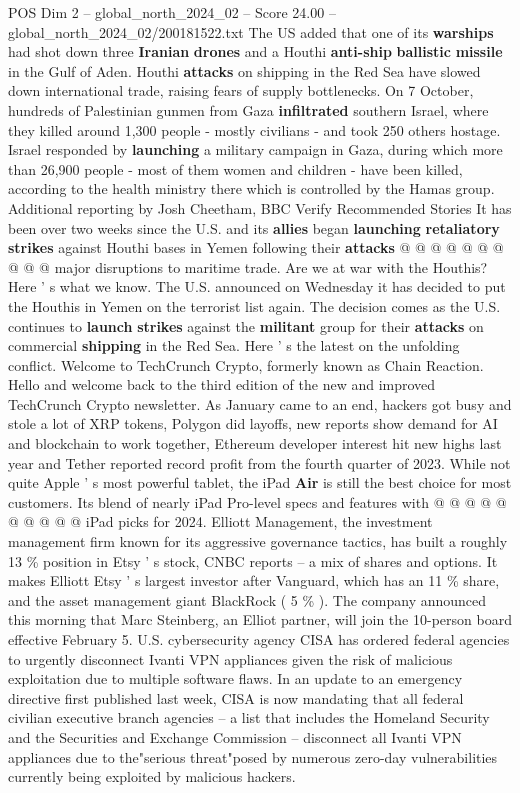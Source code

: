 \begin{textsample}{POS Dim 2 – global\_north\_2024\_02 – Score 24.00 – global\_north\_2024\_02/200181522.txt}
The US added that one of its \textbf{warships} had shot down three \textbf{Iranian} \textbf{drones} and a Houthi \textbf{anti-ship} \textbf{ballistic} \textbf{missile} in the Gulf of Aden.
Houthi \textbf{attacks} on shipping in the Red Sea have slowed down international trade, raising fears of supply bottlenecks.
On 7 October, hundreds of Palestinian gunmen from Gaza \textbf{infiltrated} southern Israel, where they killed around 1,300 people - mostly civilians - and took 250 others hostage.
Israel responded by \textbf{launching} a military campaign in Gaza, during which more than 26,900 people - most of them women and children - have been killed, according to the health ministry there which is controlled by the Hamas group.
Additional reporting by Josh Cheetham, BBC Verify Recommended Stories It has been over two weeks since the U.S. and its \textbf{allies} began \textbf{launching} \textbf{retaliatory} \textbf{strikes} against Houthi bases in Yemen following their \textbf{attacks} @ @ @ @ @ @ @ @ @ @ major disruptions to maritime trade.
Are we at war with the Houthis?
Here ' s what we know.
The U.S. announced on Wednesday it has decided to put the Houthis in Yemen on the terrorist list again.
The decision comes as the U.S. continues to \textbf{launch} \textbf{strikes} against the \textbf{militant} group for their \textbf{attacks} on commercial \textbf{shipping} in the Red Sea.
Here ' s the latest on the unfolding conflict.
Welcome to TechCrunch Crypto, formerly known as Chain Reaction.
Hello and welcome back to the third edition of the new and improved TechCrunch Crypto newsletter.
As January came to an end, hackers got busy and stole a lot of XRP tokens, Polygon did layoffs, new reports show demand for AI and blockchain to work together, Ethereum developer interest hit new highs last year and Tether reported record profit from the fourth quarter of 2023.
While not quite Apple ' s most powerful tablet, the iPad \textbf{Air} is still the best choice for most customers.
Its blend of nearly iPad Pro-level specs and features with @ @ @ @ @ @ @ @ @ @ iPad picks for 2024.
Elliott Management, the investment management firm known for its aggressive governance tactics, has built a roughly 13 \% position in Etsy ' s stock, CNBC reports -- a mix of shares and options.
It makes Elliott Etsy ' s largest investor after Vanguard, which has an 11 \% share, and the asset management giant BlackRock ( 5 \% ).
The company announced this morning that Marc Steinberg, an Elliot partner, will join the 10-person board effective February 5.
U.S. cybersecurity agency CISA has ordered federal agencies to urgently disconnect Ivanti VPN appliances given the risk of malicious exploitation due to multiple software flaws.
In an update to an emergency directive first published last week, CISA is now mandating that all federal civilian executive branch agencies -- a list that includes the Homeland Security and the Securities and Exchange Commission -- disconnect all Ivanti VPN appliances due to the"serious threat"posed by numerous zero-day vulnerabilities currently being exploited by malicious hackers.


\end{textsample}
